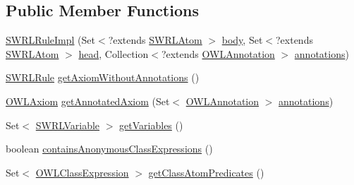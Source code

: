 \subsection*{Public Member Functions}
\begin{DoxyCompactItemize}
\item 
\hyperlink{classuk_1_1ac_1_1manchester_1_1cs_1_1owl_1_1owlapi_1_1_s_w_r_l_rule_impl_ade3fc04f5c6570cc7a82a2d4a4dfab17}{S\-W\-R\-L\-Rule\-Impl} (Set$<$?extends \hyperlink{interfaceorg_1_1semanticweb_1_1owlapi_1_1model_1_1_s_w_r_l_atom}{S\-W\-R\-L\-Atom} $>$ \hyperlink{classuk_1_1ac_1_1manchester_1_1cs_1_1owl_1_1owlapi_1_1_s_w_r_l_rule_impl_a6d430d74c0cc94fc4443853bf0f675b8}{body}, Set$<$?extends \hyperlink{interfaceorg_1_1semanticweb_1_1owlapi_1_1model_1_1_s_w_r_l_atom}{S\-W\-R\-L\-Atom} $>$ \hyperlink{classuk_1_1ac_1_1manchester_1_1cs_1_1owl_1_1owlapi_1_1_s_w_r_l_rule_impl_ac89b08481b170a322e8b794e8d5380be}{head}, Collection$<$?extends \hyperlink{interfaceorg_1_1semanticweb_1_1owlapi_1_1model_1_1_o_w_l_annotation}{O\-W\-L\-Annotation} $>$ \hyperlink{classuk_1_1ac_1_1manchester_1_1cs_1_1owl_1_1owlapi_1_1_o_w_l_axiom_impl_af6fbf6188f7bdcdc6bef5766feed695e}{annotations})
\item 
\hyperlink{interfaceorg_1_1semanticweb_1_1owlapi_1_1model_1_1_s_w_r_l_rule}{S\-W\-R\-L\-Rule} \hyperlink{classuk_1_1ac_1_1manchester_1_1cs_1_1owl_1_1owlapi_1_1_s_w_r_l_rule_impl_a7905d42c2c5f31d3069927d6e0bc991d}{get\-Axiom\-Without\-Annotations} ()
\item 
\hyperlink{interfaceorg_1_1semanticweb_1_1owlapi_1_1model_1_1_o_w_l_axiom}{O\-W\-L\-Axiom} \hyperlink{classuk_1_1ac_1_1manchester_1_1cs_1_1owl_1_1owlapi_1_1_s_w_r_l_rule_impl_a2957c968d24d0c63806e28da189eaf31}{get\-Annotated\-Axiom} (Set$<$ \hyperlink{interfaceorg_1_1semanticweb_1_1owlapi_1_1model_1_1_o_w_l_annotation}{O\-W\-L\-Annotation} $>$ \hyperlink{classuk_1_1ac_1_1manchester_1_1cs_1_1owl_1_1owlapi_1_1_o_w_l_axiom_impl_af6fbf6188f7bdcdc6bef5766feed695e}{annotations})
\item 
Set$<$ \hyperlink{interfaceorg_1_1semanticweb_1_1owlapi_1_1model_1_1_s_w_r_l_variable}{S\-W\-R\-L\-Variable} $>$ \hyperlink{classuk_1_1ac_1_1manchester_1_1cs_1_1owl_1_1owlapi_1_1_s_w_r_l_rule_impl_a04ba2021aafa052a179bfcf06a53aea4}{get\-Variables} ()
\item 
boolean \hyperlink{classuk_1_1ac_1_1manchester_1_1cs_1_1owl_1_1owlapi_1_1_s_w_r_l_rule_impl_acfe879dd3be918384842a86307ef4036}{contains\-Anonymous\-Class\-Expressions} ()
\item 
Set$<$ \hyperlink{interfaceorg_1_1semanticweb_1_1owlapi_1_1model_1_1_o_w_l_class_expression}{O\-W\-L\-Class\-Expression} $>$ \hyperlink{classuk_1_1ac_1_1manchester_1_1cs_1_1owl_1_1owlapi_1_1_s_w_r_l_rule_impl_aa71f25a49a31198e3bf685fccf2e954f}{get\-Class\-Atom\-Predicates} ()

\end{DoxyCompactItemize}
